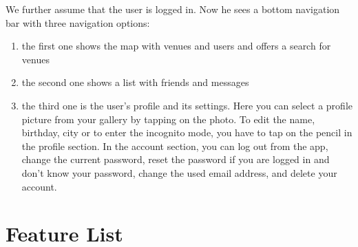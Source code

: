 \documentclass[11pt, accentcolor=tud1c]{tudreport}
\begin{document}
We further assume that the user is logged in. Now he sees a bottom navigation bar with three navigation options:
\begin{enumerate}
\item the first one shows the map with venues and users and offers a search for venues
\item the second one shows a list with friends and messages
\item the third one is the user's profile and its settings. Here you can select a profile picture from your gallery by tapping on the photo. To edit the name, birthday, city or to enter the incognito mode, you have to tap on the pencil in the profile section. In the account section, you can log out from the app, change the current password, reset the password if you are logged in and don't know your password, change the used email address, and delete your account.
\end{enumerate}

\chapter{Feature List}\label{ch:feature_list}
\end{document}
